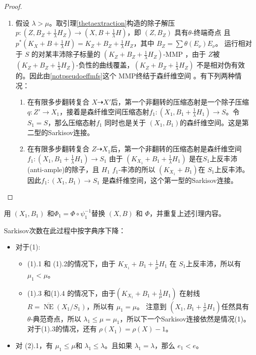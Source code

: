 \begin{proof}
\begin{enumerate}
\begin{enumerate}
    \end{enumerate}
  \item 假设 $\lambda>\mu$。取引理\ref{thetaextraction}构造的除子解压 $ p:(Z,B_Z+\frac{1}{\lambda}H_Z)\to (X,B+\frac{1}{\lambda}H) $，即   $ (Z,B_Z) $ 具有$ \theta $-终端奇点 且 $ p^*(K_X+B+\frac{1}{\lambda}H)=K_Z+B_Z+\frac{1}{\lambda}H_Z $，其中 $ B_Z=\sum\theta(E_\nu)E_\nu $。
    运行相对于 $S$ 的对某丰沛除子标量的 $ (K_Z+B_Z+\frac{1}{\lambda}H_Z) $-MMP ，由于 $Z$被 $ (K_Z+B_Z+\frac{1}{\lambda}H_Z) $-负性的曲线覆盖，$ (K_Z+B_Z+\frac{1}{\lambda}H_Z) $ 不是相对伪有效的。因此由\ref{notpseudoeffmfs}这个 MMP终结于森纤维空间 。有下列两种情况：
    \begin{enumerate}
      \item 在有限多步翻转复合 $ X\dashrightarrow X' $后，第一个非翻转的压缩态射是一个除子压缩 $ q:Z'\to X_1 $，接着是森纤维空间压缩态射$f_1:(X_1,B_1+\frac{1}{\lambda}H_1)\to S$。令$ S_1=S $，那么压缩态射$f_1$ 同时也是关于 $(X_1, B_1)$的森纤维空间。这是第二型的Sarkisov连接。
      \item 在有限多步翻转复合 $ Z\dashrightarrow X_1 $后，第一个非翻转的压缩态射是森纤维空间$f_1:(X_1,B_1+\frac{1}{\lambda}H_1)\to S_1$ 由于 $ (K_{X_1}+B_1+\frac{1}{\lambda}H_1) $ 是在$S_1$上反丰沛(anti-ample)的除子，且 $ H_1 $  $ f_1 $-丰沛的所以 $(K_{X_1}+B_1) $在 $S_1$上反丰沛。因此$ f_1:(X_1, B_1)\to S_1 $ 是森纤维空间，这个第一型的Sarkisov连接。
    \end{enumerate}
  \end{enumerate}
\end{proof}
用  $(X_1,B_1)$ 和$\Phi_{1}=\Phi\circ\psi_1^{-1}$替换 $(X,B)$ 和 $\Phi$，并重复上述引理内容。 
\begin{remark} \label{R-Sarkisovdeg}
  Sarkisov次数在此过程中按字典序下降：
  \begin{itemize}
    \item 对于(1):
      \begin{itemize}
            \item  (1).1 和 (1).2的情况下，由于 $ K_{X_1}+B_1+\frac{1}{\mu}H_1 $ 在 $S_1$上反丰沛，所以有 $\mu_1<\mu$。
            \item (1).3 和(1).4 的情况下，由于$ (K_{X_1}+B_1+\frac{1}{\mu}H_1) $ 在射线 $ R=\overline{\operatorname{NE}}(X_1/S_1) $，所以有 $\mu_1=\mu$。
              注意到 $ (X_1,B_1+\frac{1}{\mu}H_1) $任然具有$ \theta $-典范奇点，所以 $\lambda_1\leqslant \mu=\mu_1$，所以下一个Sarkisov连接依然是情况(1)。对于(1).3的情况，还有 $\rho(X_1)=\rho(X)-1$。
      \end{itemize}
    \item 对 (2).1，有 $\mu_1\leqslant \mu$和  $\lambda_1\leqslant \lambda$。且如果 $ \lambda_1=\lambda $，那么 $e_1<e$。
  \end{itemize}
\end{remark}


